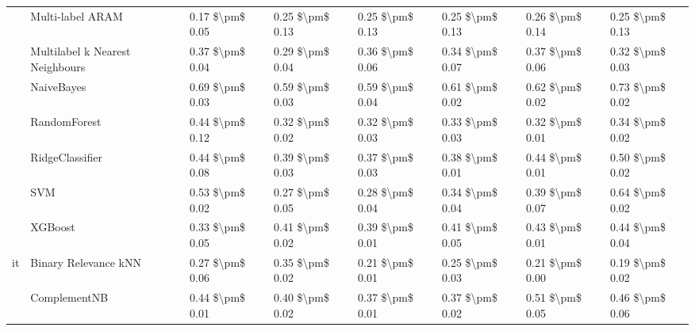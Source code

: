 \begin{tabular}{llllllll}
   & Multi-label ARAM &      0.17 \$\textbackslash pm\$ 0.05 &           0.25 \$\textbackslash pm\$ 0.13 &       0.25 \$\textbackslash pm\$ 0.13 &        0.25 \$\textbackslash pm\$ 0.13 &                         0.26 \$\textbackslash pm\$ 0.14 &      0.25 \$\textbackslash pm\$ 0.13 \\
   & Multilabel k Nearest Neighbours &      0.37 \$\textbackslash pm\$ 0.04 &           0.29 \$\textbackslash pm\$ 0.04 &       0.36 \$\textbackslash pm\$ 0.06 &        0.34 \$\textbackslash pm\$ 0.07 &                         0.37 \$\textbackslash pm\$ 0.06 &      0.32 \$\textbackslash pm\$ 0.03 \\
   & NaiveBayes &      0.69 \$\textbackslash pm\$ 0.03 &           0.59 \$\textbackslash pm\$ 0.03 &       0.59 \$\textbackslash pm\$ 0.04 &        0.61 \$\textbackslash pm\$ 0.02 &                         0.62 \$\textbackslash pm\$ 0.02 &      0.73 \$\textbackslash pm\$ 0.02 \\
   & RandomForest &      0.44 \$\textbackslash pm\$ 0.12 &           0.32 \$\textbackslash pm\$ 0.02 &       0.32 \$\textbackslash pm\$ 0.03 &        0.33 \$\textbackslash pm\$ 0.03 &                         0.32 \$\textbackslash pm\$ 0.01 &      0.34 \$\textbackslash pm\$ 0.02 \\
   & RidgeClassifier &      0.44 \$\textbackslash pm\$ 0.08 &           0.39 \$\textbackslash pm\$ 0.03 &       0.37 \$\textbackslash pm\$ 0.03 &        0.38 \$\textbackslash pm\$ 0.01 &                         0.44 \$\textbackslash pm\$ 0.01 &      0.50 \$\textbackslash pm\$ 0.02 \\
   & SVM &      0.53 \$\textbackslash pm\$ 0.02 &           0.27 \$\textbackslash pm\$ 0.05 &       0.28 \$\textbackslash pm\$ 0.04 &        0.34 \$\textbackslash pm\$ 0.04 &                         0.39 \$\textbackslash pm\$ 0.07 &      0.64 \$\textbackslash pm\$ 0.02 \\
   & XGBoost &      0.33 \$\textbackslash pm\$ 0.05 &           0.41 \$\textbackslash pm\$ 0.02 &       0.39 \$\textbackslash pm\$ 0.01 &        0.41 \$\textbackslash pm\$ 0.05 &                         0.43 \$\textbackslash pm\$ 0.01 &      0.44 \$\textbackslash pm\$ 0.04 \\
it & Binary Relevance kNN &      0.27 \$\textbackslash pm\$ 0.06 &           0.35 \$\textbackslash pm\$ 0.02 &       0.21 \$\textbackslash pm\$ 0.01 &        0.25 \$\textbackslash pm\$ 0.03 &                         0.21 \$\textbackslash pm\$ 0.00 &      0.19 \$\textbackslash pm\$ 0.02 \\
   & ComplementNB &      0.44 \$\textbackslash pm\$ 0.01 &           0.40 \$\textbackslash pm\$ 0.02 &       0.37 \$\textbackslash pm\$ 0.01 &        0.37 \$\textbackslash pm\$ 0.02 &                         0.51 \$\textbackslash pm\$ 0.05 &      0.46 \$\textbackslash pm\$ 0.06 \\

\end{tabular}
